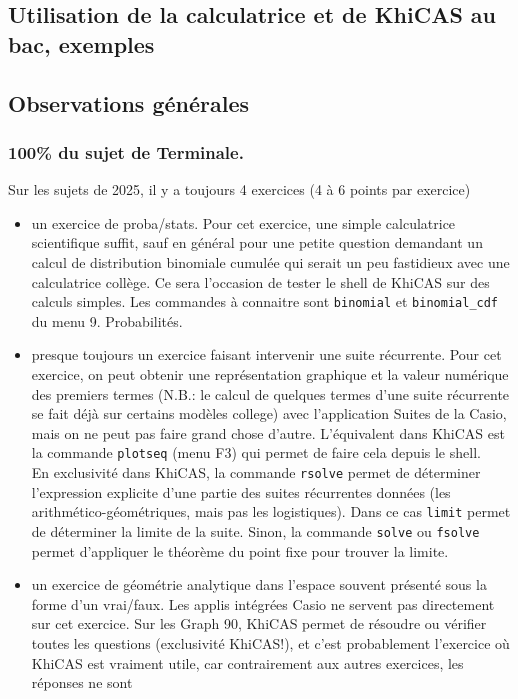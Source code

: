 \documentclass{article}
\begin{document}
\begin{giacjshere}
\section{Utilisation de la calculatrice et de KhiCAS au bac, exemples} \label{sec:bac25}
\subsection{Observations générales}
\subsubsection{100\% du sujet de Terminale.}
Sur les sujets de 2025, il y a toujours 4 exercices (4 à 6 points par exercice)
\begin{itemize}
\item un exercice de proba/stats. Pour cet exercice, une simple
calculatrice scientifique suffit, sauf en général pour une petite
question demandant un calcul de distribution binomiale cumulée qui
serait un peu fastidieux avec une calculatrice collège. Ce sera l'occasion
de tester le shell de KhiCAS sur des calculs simples. Les
commandes à connaitre sont {\tt binomial} et
{\tt binomial\_cdf} du menu 9. Probabilités.
\item presque toujours un exercice faisant intervenir une suite récurrente.
Pour cet exercice, on peut obtenir une représentation graphique
et la valeur numérique des premiers termes (N.B.: le calcul de 
quelques termes d'une suite
récurrente se fait déjà sur certains modèles college)
avec l'application Suites de la Casio, mais on ne peut pas faire
grand chose d'autre. 
L'équivalent dans KhiCAS est la commande
{\tt plotseq} (menu F3) qui permet de faire cela depuis le shell.\\
En exclusivité dans KhiCAS,
la commande {\tt rsolve} permet de déterminer l'expression
explicite d'une partie des suites récurrentes données (les
arithmético-géométriques, mais pas les logistiques). Dans
ce cas {\tt limit} permet de déterminer la limite de la suite.
Sinon, la commande {\tt solve} ou {\tt fsolve}
permet d'appliquer le théorème du point fixe pour trouver
la limite.
\item un exercice de géométrie analytique dans l'espace
souvent présenté sous la forme d'un vrai/faux. Les
applis intégrées Casio ne servent pas directement sur cet exercice.
Sur les Graph 90, KhiCAS permet de résoudre ou vérifier toutes les 
questions (exclusivité KhiCAS!),
et c'est probablement l'exercice où KhiCAS est vraiment utile,
car contrairement aux autres exercices, les réponses ne sont

\end{itemize}
\end{giacjshere}
\end{document}
